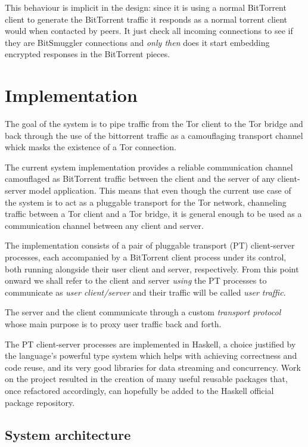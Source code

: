 \documentclass[11pt]{book} %
\newcommand{\projectName}{BitSmuggler }
\begin{document}
This behaviour is implicit in the design: since it is using a normal BitTorrent client to generate the BitTorrent traffic it responds as a normal torrent client would when contacted by peers. It just check all incoming connections to see if they are \projectName connections and \textit{only then} does it start embedding encrypted responses in the BitTorrent pieces.


\section{Implementation}

The goal of the system is to pipe traffic from the Tor client to the Tor bridge and back through the use of the bittorrent traffic as a camouflaging transport channel whick masks the existence of a Tor connection.

The current system implementation provides a reliable communication channel camouflaged as BitTorrent traffic between the client and the server of any client-server model application. This means that even though the current use case of the system is to act as a pluggable transport for the Tor network, channeling traffic between a Tor client and a Tor bridge, it is general enough to be used as a communication channel between any client and server.

The implementation consists of a pair of pluggable transport (PT) client-server processes, each accompanied by a BitTorrent client process under its control, both running alongside their user client and server, respectively. From this point onward we shall refer to the client and server \textit{using} the PT processes to communicate as \textit{user client/server} and their traffic will be called \textit{user traffic}. 

The server and the client communicate through a custom \textit{transport protocol} whose main purpose is to proxy user traffic back and forth. 

The PT client-server processes are implemented in Haskell, a choice justified by the language's powerful type system which helps with achieving correctness and code reuse, and its very good libraries for data streaming and concurrency. Work on the project resulted in the creation of many useful reusable packages that, once refactored accordingly, can hopefully be added to the Haskell official package repository.

\subsection{System architecture}
\end{document}
